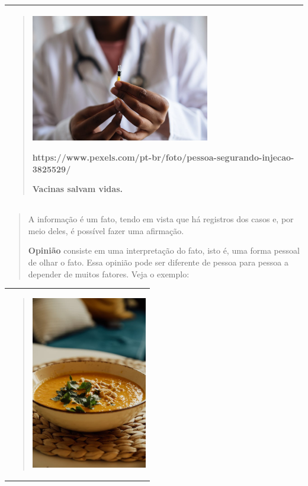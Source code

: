 \begin{itemize}
{{{\begin{itemize}
\begin{itemize}
\begin{itemize}
\begin{longtable}[]{@{}l@{}}
\toprule
\begin{minipage}[t]{0.97\columnwidth}\raggedright\strut
\begin{quote}
\includegraphics[width=3.07626in,height=2.19722in]{media/image26.jpeg}

https://www.pexels.com/pt-br/foto/pessoa-segurando-injecao-3825529/

Vacinas salvam vidas.
\end{quote}\strut
\end{minipage}\tabularnewline
\bottomrule
\end{longtable}

\begin{quote}
A informação é um fato, tendo em vista que há registros dos casos e, por
meio deles, é possível fazer uma afirmação.

\textbf{Opinião} consiste em uma interpretação do fato, isto é, uma
forma pessoal de olhar o fato. Essa opinião pode ser diferente de pessoa
para pessoa a depender de muitos fatores. Veja o exemplo:
\end{quote}

\begin{longtable}[]{@{}l@{}}
\toprule
\begin{minipage}[t]{0.97\columnwidth}\raggedright\strut
\begin{quote}
\includegraphics[width=1.98958in,height=2.97842in]{media/image27.jpeg}


\end{quote}
\end{minipage}
\end{longtable}
\end{itemize}
\end{itemize}
\end{itemize}}}}
\end{itemize}
